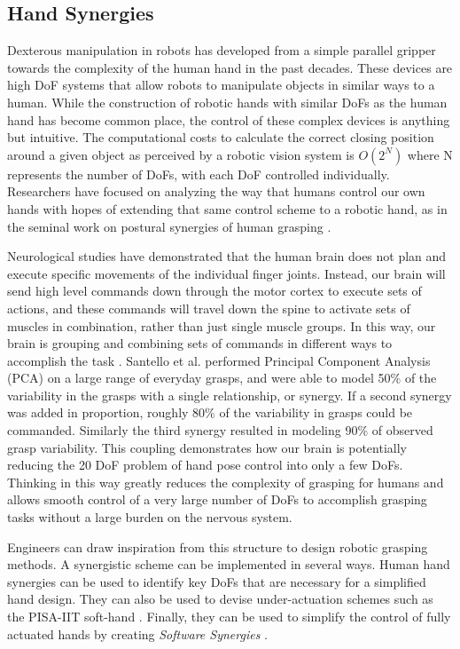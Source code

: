 \documentclass[runningheads,a4paper]{llncs}
\begin{document}
\subsection{Hand Synergies}
	Dexterous manipulation in robots has developed from a simple parallel gripper towards the complexity of the human hand in the past decades. These devices are high DoF systems that allow robots to manipulate objects in similar ways to a human. While the construction of robotic hands with similar DoFs as the human hand has become common place, the control of these complex devices is anything but intuitive. The computational costs to calculate the correct closing position around a given object as perceived by a robotic vision system is $O(2^N)$
 where N represents the number of DoFs, with each DoF controlled individually. Researchers have focused on analyzing the way that humans control our own hands with hopes of extending that same control scheme to a robotic hand, as in the seminal work on postural synergies of human grasping \cite{Santello}. 

Neurological studies have demonstrated that the human brain does not plan and execute specific movements of the individual finger joints. Instead, our brain will send high level commands down through the motor cortex to execute sets of actions, and these commands will travel down the spine to activate sets of muscles in combination, rather than just single muscle groups. In this way, our brain is grouping and combining sets of commands in different ways to accomplish the task \cite{neuro}.  Santello et al. performed Principal Component Analysis (PCA) on a large range of everyday grasps, and were able to model 50$\%$ of the variability in the grasps with a single relationship, or synergy. If a second synergy was added in proportion, roughly 80$\%$  of the variability in grasps could be commanded. Similarly the third synergy resulted in modeling 90$\%$  of observed grasp variability. This coupling demonstrates how our brain is potentially reducing the 20 DoF problem of hand pose control into only a few DoFs. Thinking in this way greatly reduces the complexity of grasping for humans and allows smooth control of a very large number of DoFs to accomplish grasping  tasks without a large burden on the nervous system. 

 Engineers can draw inspiration from this structure to design robotic grasping methods.  A synergistic scheme can be implemented in several ways.  Human hand synergies can be used to identify key DoFs that are necessary for a simplified hand design.  They can also be used to devise under-actuation schemes such as the PISA-IIT soft-hand \cite{softhand}.  Finally, they can be used to simplify the control of fully actuated hands by creating \textit{Software Synergies} \cite{catalano_2012_adaptive}.  
\end{document}
